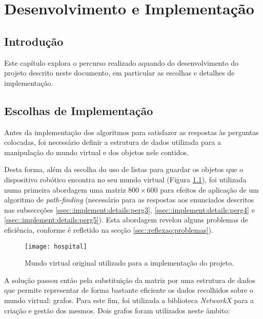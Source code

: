 \chapter{Desenvolvimento e Implementação}
\label{ch::implement}

\section{Introdução}
\label{sec::implement:intro}

Este capítulo explora o percurso realizado aquando do desenvolvimento do projeto descrito neste documento, em particular as escolhas e detalhes de implementação.


\section{Escolhas de Implementação}
\label{sec::implement:struct}

Antes da implementação dos algoritmos para satisfazer as respostas às perguntas colocadas, foi necessário definir a estrutura de dados utilizada para a manipulação do mundo virtual e dos objetos nele contidos.

Desta forma, além da escolha do uso de listas para guardar os objetos que o dispositivo robótico encontra no seu mundo virtual (Figura \ref{fig::hospital}), foi utilizada numa primeira abordagem uma matriz $800\times600$ para efeitos de aplicação de um algoritmo de \textit{path-finding} (necessário para as respostas aos enunciados descritos nas subseccções \ref{ssec::implement:details:perg3}, \ref{ssec::implement:details:perg4} e \ref{ssec::implement:details:perg5}). Esta abordagem revelou alguns problemas de eficiência, conforme é refletido na secção \ref{sec::reflexao:problemas}).

\begin{figure}[!hbtp]
    \centering
    \texttt{[image: hospital]}
    \caption[Mundo utilizado para implementação do projeto]{Mundo virtual original utilizado para a implementação do projeto.}
    \label{fig::hospital}
\end{figure}

A solução passou então pela substituição da matriz por uma estrutura de dados que permite representar de forma bastante eficiente os dados recolhidos sobre o mundo virtual: grafos. Para este fim, foi utilizada a biblioteca \emph{NetworkX} \cite{NetworkX} para a criação e gestão dos mesmos. Dois grafos foram utilizados neste âmbito:

